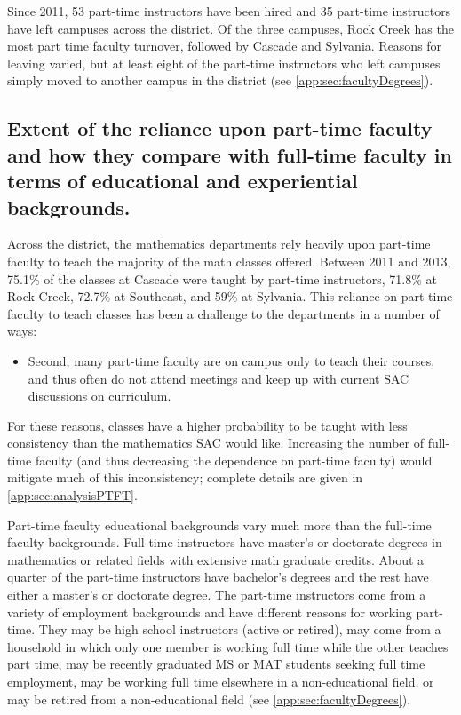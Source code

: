 Since 2011, 53 part-time instructors have been hired and 35 part-time
instructors have left campuses across the district.  Of the three campuses,
Rock Creek has the most part time faculty turnover, followed by Cascade and
Sylvania.  Reasons for leaving varied, but at least eight of the part-time
instructors who left campuses simply moved to another campus in the district
(see \vref{app:sec:facultyDegrees}).

\subsection{Extent of the reliance upon part-time faculty and how they compare
with full-time faculty in terms of educational and experiential backgrounds.}
Across the district, the mathematics departments rely heavily upon part-time
faculty to teach the majority of the math classes offered.  Between 2011 and
2013, 75.1\% of the classes at Cascade were taught by part-time instructors,
71.8\% at Rock Creek, 72.7\% at Southeast, and 59\% at Sylvania.  This reliance
on part-time faculty to teach classes has been a challenge to the departments
in a number of ways:  
\begin{itemize}
the turnover of part-time faculty is higher and
thus there is a need to orient new employees more frequently and provide
mentoring and guidance to them as well;
\item  Second, many part-time faculty are on
campus only to teach their courses, and thus often do not attend meetings and
keep up with current SAC discussions on curriculum.  
\end{itemize}
For these reasons, classes have a higher probability to be taught with less consistency than the
mathematics SAC would like.  Increasing the number of full-time faculty (and
thus decreasing the dependence on part-time faculty) would mitigate much of
this inconsistency; complete details are given in  \vref{app:sec:analysisPTFT}.

Part-time faculty educational backgrounds vary much more than the full-time
faculty backgrounds.  Full-time instructors have master's or doctorate degrees
in mathematics or related fields with extensive math graduate credits.  About a
quarter of the part-time instructors have bachelor's degrees and the rest have
either a master's or doctorate degree.  The part-time instructors come from a
variety of employment backgrounds and have different reasons for working
part-time.  They may be high school instructors (active or retired), may come
from a household in which only one member is working full time while the other
teaches part time, may be recently graduated MS or MAT students seeking full
time employment, may be working full time elsewhere in a non-educational field,
or may be retired from a non-educational field (see
\vref{app:sec:facultyDegrees}).

